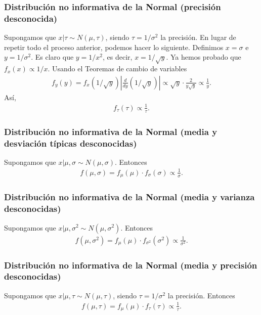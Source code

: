 \subsubsection{Distribución no informativa de la Normal (precisión desconocida)}
\noindent Supongamos que $x | \tau \sim N(\mu,\tau)$, siendo $\tau = 1/\sigma^2$ la precisión. En lugar de repetir todo el proceso anterior, podemos hacer lo siguiente. Definimos $x = \sigma$ e $y = 1/\sigma^2$. Es claro que $y = 1/x^2$, es decir, $x = 1/\sqrt{y}$. Ya hemos probado que $f_{x}(x) \propto 1/x$. Usando el Teoremas de cambio de variables
\begin{align*}
    f_y(y) = f_x\left( 1/\sqrt{y} \right) \left| \frac{d}{dy} \left( 1/\sqrt{y} \right) \right| \propto \sqrt{y} \cdot \frac{2}{y\sqrt{y}} \propto \frac{1}{y}.
\end{align*}
Así,
\begin{align*}
    f_{\tau}(\tau) \propto \frac{1}{\tau}.
\end{align*}

\subsubsection{Distribución no informativa de la Normal (media y desviación típicas desconocidas)}
\noindent Supongamos que $x | \mu,\sigma \sim N(\mu,\sigma)$. Entonces
\begin{align*}
    f(\mu,\sigma) = f_{\mu}(\mu) \cdot f_{\sigma}(\sigma) \propto \frac{1}{\sigma}.
\end{align*}

\subsubsection{Distribución no informativa de la Normal (media y varianza desconocidas)}
\noindent Supongamos que $x | \mu,\sigma^2 \sim N(\mu,\sigma^2)$. Entonces
\begin{align*}
    f(\mu,\sigma^2) = f_{\mu}(\mu) \cdot f_{\sigma^2}(\sigma^2) \propto \frac{1}{\sigma^2}.
\end{align*}
\subsubsection{Distribución no informativa de la Normal (media y precisión desconocidas)}
\noindent Supongamos que $x | \mu,\tau \sim N(\mu,\tau)$, siendo $\tau = 1/\sigma^2$ la precisión. Entonces
\begin{align*}
    f(\mu,\tau) = f_{\mu}(\mu) \cdot f_{\tau}(\tau) \propto \frac{1}{\tau}.
\end{align*}

